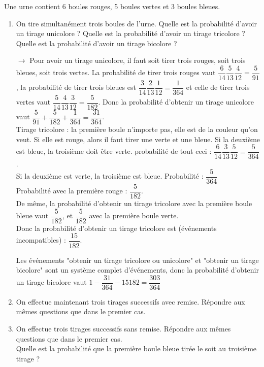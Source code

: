 \documentclass[12pt,a4paper]{report}
\begin{document}
\begin{exemple}[Exercice 6]{}
Une urne contient 6 boules rouges, 5 boules vertes et 3 boules bleues.
\begin{enumerate}
	\item On tire simultanément trois boules de l'urne. Quelle est la probabilité d'avoir un tirage unicolore ? Quelle est la probabilité d'avoir un tirage 
	tricolore ? Quelle est la probabilité d'avoir un tirage bicolore ?
	
	$\rightarrow$ Pour avoir un tirage unicolore, il faut soit tirer trois rouges, soit trois bleues, soit trois vertes. La probabilité de tirer trois rouges vaut $\dfrac{6}{14}\dfrac{5}{13}\dfrac{4}{12} = \dfrac{5}{91}$, la probabilité de tirer trois bleues est $\dfrac{3}{14} \dfrac{2}{13} \dfrac{1}{12} = \dfrac{1}{364}$ et celle de tirer trois vertes vaut $\dfrac{5}{14}\dfrac{4}{13}\dfrac{3}{12} = \dfrac{5}{182}$. Donc la probabilité d'obtenir un tirage unicolore vaut $\dfrac{5}{91} + \dfrac{5}{182} + \dfrac{1}{364} = \dfrac{31}{364}$. \\
	
	Tirage tricolore : la première boule n'importe pas, elle est de la couleur qu'on veut.
	Si elle est rouge, alors il faut tirer une verte et une bleue. Si la deuxième est bleue, la troisième doit être verte. probabilité de tout ceci : $\dfrac{6}
{14}\dfrac{3}{13}\dfrac{5}{12} = \dfrac{5}{364}$. \\
	Si la deuxième est verte, la troisième est bleue. Probabilité : $\dfrac{5}{364}$ \\
	Probabilité avec la première rouge : $\dfrac{5}{182}$. \\
	De même, la probabilité d'obtenir un tirage tricolore avec la première boule bleue vaut $\dfrac{5}{182}$, et $\dfrac{5}{182}$ avec la première boule verte. \\
	Donc la probabilité d'obtenir un tirage tricolore est (événements incompatibles) : $\dfrac{15}{182}$.
	
	Les événements "obtenir un tirage tricolore ou unicolore" et "obtenir un tirage bicolore" sont un système complet d'événements, donc la probabilité d'obtenir un 
	tirage bicolore vaut $1-\dfrac{31}{364}-{15}{182} = \dfrac{303}{364}$
	
	\item On effectue maintenant trois tirages successifs avec remise. Répondre aux mêmes questions que dans le premier cas.
	
	\item On effectue trois tirages successifs sans remise. Répondre aux mêmes questions que dans le premier cas. \\
	Quelle est la probabilité que la première boule bleue tirée le soit au troisième tirage ? 
	
\end{enumerate}

\end{exemple}
\end{document}
